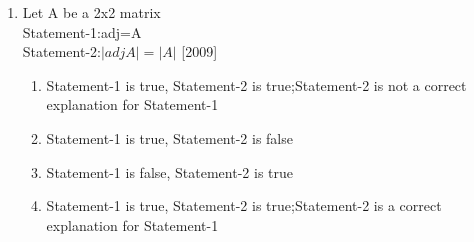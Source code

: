 \documentclass[journal,12pt,twocolumn]{IEEEtran}
\theoremstyle{remark}
\begin{document}
\begin{enumerate}
\begin{enumerate}[label=\alph*)]
\end{enumerate}
\item Let A be a 2x2 matrix \\
	Statement-1:adj=A \\
	Statement-2:$|adjA|=|A|$ \hfill{[2009]}
\begin{enumerate}[label=\alph*)]
	\item Statement-1 is true, Statement-2 is true;Statement-2 is not a correct explanation for Statement-1
	\item Statement-1 is true, Statement-2 is false
	\item Statement-1 is false, Statement-2 is true
	\item Statement-1 is true, Statement-2 is true;Statement-2 is a correct explanation for Statement-1
\end{enumerate}

\end{enumerate}
\end{document}
